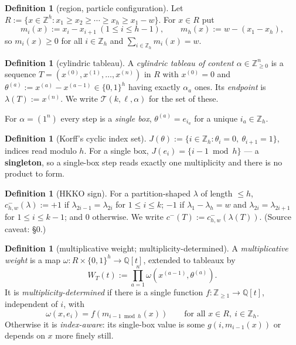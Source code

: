 \documentclass[11pt]{article}
\theoremstyle{plain}
\theoremstyle{definition}
\newtheorem{definition}[theorem]{Definition}
\theoremstyle{remark}
\newcommand{\Zh}{\mathbb{Z}_h}
\newcommand{\cm}{c^{-}}
\begin{document}
\begin{definition}[region, particle configuration]
Let
$R:=\{x\in\mathbb{Z}^h: x_1\geq x_2\geq\cdots\geq x_h\geq x_1-w\}$.
For $x\in R$ put
\[
m_i(x):=x_i-x_{i+1}\ (1\leq i\leq h-1),\qquad m_h(x):=w-(x_1-x_h),
\]
so $m_i(x)\geq 0$ for all $i\in\Zh$ and $\sum_{i\in\Zh}m_i(x)=w$.
\end{definition}

\begin{definition}[cylindric tableau]
A \emph{cylindric tableau of content $\alpha\in\mathbb{Z}_{\geq0}^n$} is a sequence
$T=(x^{(0)},x^{(1)},\dots,x^{(n)})$ in $R$ with $x^{(0)}=0$ and
$\theta^{(a)}:=x^{(a)}-x^{(a-1)}\in\{0,1\}^h$ having exactly $\alpha_a$ ones. Its
\emph{endpoint} is $\lambda(T):=x^{(n)}$. We write $\mathcal{T}(k,\ell,\alpha)$ for the set
of these.
\end{definition}

For $\alpha=(1^n)$ every step is a \emph{single box}, $\theta^{(a)}=e_{i_a}$ for a unique
$i_a\in\Zh$.

\begin{definition}[Korff's cyclic index set]
$J(\theta):=\{i\in\Zh:\theta_i=0,\ \theta_{i+1}=1\}$, indices read modulo $h$. For a single
box, $J(e_i)=\{i-1 \bmod h\}$ --- a \textbf{singleton}, so a single-box step reads exactly
one multiplicity and there is no product to form.
\end{definition}

\begin{definition}[HKKO sign]
For a partition-shaped $\lambda$ of length $\leq h$,
$\cm_{h,w}(\lambda) := +1$ if $\lambda_{2i-1}=\lambda_{2i}$ for $1\le i\le k$;
$-1$ if $\lambda_1-\lambda_h=w$ and $\lambda_{2i}=\lambda_{2i+1}$ for $1\le i\le k-1$;
and $0$ otherwise. We write $\cm(T):=\cm_{h,w}(\lambda(T))$. (Source caveat: \S0.)
\end{definition}

\begin{definition}[multiplicative weight; multiplicity-determined]\label{def:weight}
A \emph{multiplicative weight} is a map $\omega:R\times\{0,1\}^h\to\mathbb{Q}[t]$, extended
to tableaux by
\[
W_T(t):=\prod_{a=1}^{n}\omega\!\left(x^{(a-1)},\theta^{(a)}\right).
\]
It is \emph{multiplicity-determined} if there is a single function
$f:\mathbb{Z}_{\geq1}\to\mathbb{Q}[t]$, independent of $i$, with
\[
\omega(x,e_i)=f\!\left(m_{i-1\bmod h}(x)\right)\qquad\text{for all }x\in R,\ i\in\Zh .
\]
Otherwise it is \emph{index-aware}: its single-box value is some $g(i,m_{i-1}(x))$ or
depends on $x$ more finely still.
\end{definition}
\end{document}
